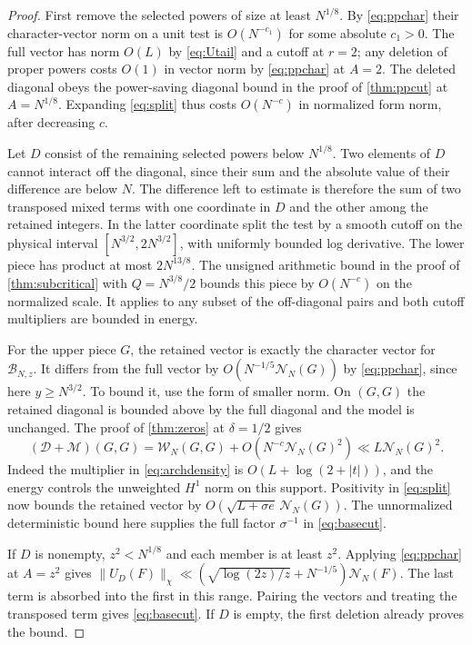 \documentclass[11pt,a4paper]{article}
\numberwithin{equation}{section}
\newcommand{\NN}{\mathcal N_N}
\begin{document}
\begin{proof}
First remove the selected powers of size at least $N^{1/8}$.
By \cref{eq:ppchar} their character-vector norm on a unit test is
$O(N^{-c_1})$ for some absolute $c_1>0$. The full vector has norm
$O(L)$ by \cref{eq:Utail} and a cutoff at $r=2$; any deletion of
proper powers costs $O(1)$ in vector norm by \cref{eq:ppchar} at
$A=2$. The deleted diagonal obeys the power-saving diagonal bound
in the proof of \cref{thm:ppcut} at $A=N^{1/8}$. Expanding
\cref{eq:split} thus costs $O(N^{-c})$ in normalized form norm,
after decreasing $c$.

Let $D$ consist of the remaining selected powers below $N^{1/8}$.
Two elements of $D$ cannot interact off the diagonal, since their
sum and the absolute value of their difference are below $N$.
The difference left to estimate is therefore the sum of two
transposed mixed terms with one coordinate in $D$ and the other
among the retained integers. In the latter coordinate split the
test by a smooth cutoff on the physical interval
$[N^{3/2},2N^{3/2}]$, with uniformly bounded log derivative.
The lower piece has product at most $2N^{13/8}$.
The unsigned arithmetic bound in the proof of \cref{thm:subcritical}
with $Q=N^{3/8}/2$ bounds this piece by $O(N^{-c})$ on the
normalized scale. It applies to any subset of the off-diagonal
pairs and both cutoff multipliers are bounded in energy.

For the upper piece $G$, the retained vector is exactly the
character vector for $\mathcal B_{N,z}$. It differs from the full
vector by $O(N^{-1/5}\NN(G))$ by \cref{eq:ppchar}, since here
$y\ge N^{3/2}$. To bound it, use the form of smaller norm.
On $(G,G)$ the retained diagonal is bounded above by the full
diagonal and the model is unchanged. The proof of \cref{thm:zeros}
at $\delta=1/2$ gives
\[
 (\mathcal D+\mathcal M)(G,G)
   =\mathcal W_N(G,G)+O(N^{-c}\NN(G)^2)
   \ll L\NN(G)^2 .
\]
Indeed the multiplier in \cref{eq:archdensity} is
$O(L+\log(2+|t|))$, and the energy controls the unweighted $H^1$
norm on this support. Positivity in \cref{eq:split} now bounds
the retained vector by $O(\sqrt{L+\sigma e}\,\NN(G))$.
The unnormalized deterministic bound here supplies the full
factor $\sigma^{-1}$ in \cref{eq:basecut}.

If $D$ is nonempty, $z^2<N^{1/8}$ and each member is at least
$z^2$. Applying \cref{eq:ppchar} at $A=z^2$ gives
$\|U_D(F)\|_\chi\ll(\sqrt{\log(2z)/z}+N^{-1/5})\NN(F)$.
The last term is absorbed into the first in this range. Pairing
the vectors and treating the transposed term gives \cref{eq:basecut}.
If $D$ is empty, the first deletion already proves the bound.


\end{proof}
\end{document}
